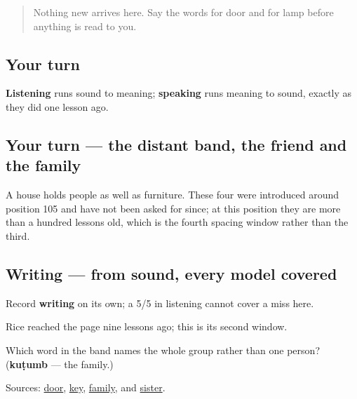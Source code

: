 \label{lesson:GU-R28-house-five-r1}



\begin{quote}
Nothing new arrives here. Say the words for door and for lamp before anything is read to you.
\end{quote}

\subsection*{Your turn}
\textbf{Listening} runs sound to meaning; \textbf{speaking} runs meaning to sound, exactly as they did one lesson ago.

\subsection*{Your turn — the distant band, the friend and the family}
A house holds people as well as furniture. These four were introduced around position 105 and have not been asked for since; at this position they are more than a hundred lessons old, which is the fourth spacing window rather than the third.

\subsection*{Writing — from sound, every model covered}
Record \textbf{writing} on its own; a 5/5 in listening cannot cover a miss here.

Rice reached the page nine lessons ago; this is its second window.

\begin{tcolorbox}[breakable,colback=teal!4,colframe=teal!35!black,title={Before you move on}]
Which word in the band names the whole group rather than one person? (\textbf{kuṭumb} — the family.)

Sources: \href{https://dictionary.cambridge.org/dictionary/english-gujarati/door}{door}, \href{https://dictionary.cambridge.org/dictionary/english-gujarati/key}{key}, \href{https://dictionary.cambridge.org/dictionary/english-gujarati/family}{family}, and \href{https://dictionary.cambridge.org/dictionary/english-gujarati/sister}{sister}.
\end{tcolorbox}
